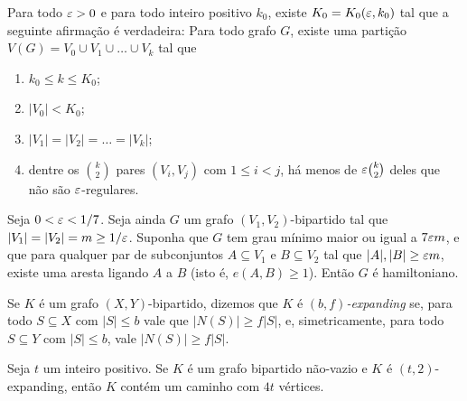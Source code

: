 \begin{lema}
	Para todo $\varepsilon>0$ e para todo inteiro positivo $k_0$, existe $K_0 = K_0(\varepsilon,k_0)$ tal que a seguinte afirmação é verdadeira: Para todo grafo $G$, existe uma partição $V(G) = V_0\cup V_1\cup\dots\cup V_k$ tal que 
	\begin{enumerate}
		\item $k_0\leq k\leq K_0$;
		\item $|V_0| < K_0$;
		\item $|V_1| = |V_2| = \dots = |V_k|$;
		\item dentre os $k\choose 2$ pares $(V_i, V_j)$ com $1\leq i<j$, há menos de $\varepsilon {k\choose 2}$ deles que não são $\varepsilon$-regulares.
	\end{enumerate}
\end{lema}

\begin{lema}\label{lema:haxell}
	Seja $0<\varepsilon<1/7$. Seja ainda $G$ um grafo $(V_1, V_2)$-bipartido tal que $|V_1| = |V_2| = m\geq1/\varepsilon$. Suponha que $G$ tem grau mínimo maior ou igual a $7\varepsilon m$, e que para qualquer par de subconjuntos $A\subseteq V_1$ e $B\subseteq V_2$ tal que $|A|,|B|\geq \varepsilon m$, existe uma aresta ligando $A$ a $B$ (isto é, $e(A, B)\geq1$). Então $G$ é hamiltoniano.
\end{lema}

\begin{defi}
	Se $K$ é um grafo $(X,Y)$-bipartido, dizemos que $K$ é \emph{$(b,f)$-expanding} se, para todo $S\subseteq X$ com $|S|\leq b$ vale que $|N(S)|\geq f|S|$, e, simetricamente, para todo $S\subseteq Y$ com $|S|\leq b$, vale $|N(S)|\geq f|S|$.
\end{defi}

\begin{prop}
	Seja $t$ um inteiro positivo. Se $K$ é um grafo bipartido não-vazio e $K$ é $(t,2)$-expanding, então $K$ contém um caminho com $4t$ vértices.
\end{prop}

